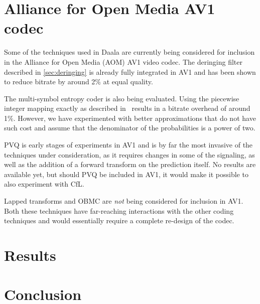 \documentclass[english,conference,10pt]{IEEEtran}
\begin{document}
\section{Alliance for Open Media AV1 codec}
\label{sec:AOM}

Some of the techniques used in Daala are currently being considered for
inclusion in the Alliance for Open Media (AOM) AV1 video codec. The
deringing filter described in \cref{sec:deringing} is already
fully integrated in AV1 and has been shown to reduce bitrate by around 2\%
at equal quality. 

The multi-symbol entropy coder is also being evaluated. Using the piecewise
integer mapping exactly as described in~\cite{stuiver1998piecewise} results
in a bitrate overhead of around 1\%. However, we have experimented with
better approximations that do not have such cost and assume that
the denominator of the probabilities is a power of two.

PVQ is early stages of experiments in AV1 and is by far the most invasive
of the techniques under consideration, as it requires changes in some
of the signaling, as well as the addition of a forward transform on the
prediction itself. No results are available yet, but should PVQ be
included in AV1, it would make it possible to also experiment with CfL.

Lapped transforms and OBMC are \textit{not} being considered for inclusion
in AV1. Both these techniques have far-reaching interactions with the
other coding techniques and would essentially require a complete re-design
of the codec. 

\section{Results}
\label{sec:Results}


\section{Conclusion}



\end{document}
